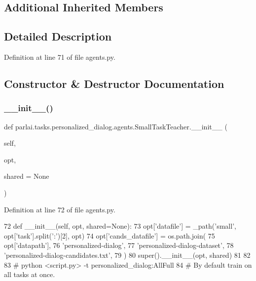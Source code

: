 \subsection*{Additional Inherited Members}


\subsection{Detailed Description}


Definition at line 71 of file agents.\+py.



\subsection{Constructor \& Destructor Documentation}
\mbox{\label{classparlai_1_1tasks_1_1personalized__dialog_1_1agents_1_1SmallTaskTeacher_a2e707f17a77f97a8a04ee9737d627209}} 
\subsubsection{\texorpdfstring{\+\_\+\+\_\+init\+\_\+\+\_\+()}{\_\_init\_\_()}}
{\footnotesize\ttfamily def parlai.\+tasks.\+personalized\+\_\+dialog.\+agents.\+Small\+Task\+Teacher.\+\_\+\+\_\+init\+\_\+\+\_\+ (\begin{DoxyParamCaption}\item[{}]{self,  }\item[{}]{opt,  }\item[{}]{shared = {\ttfamily None} }\end{DoxyParamCaption})}



Definition at line 72 of file agents.\+py.


\begin{DoxyCode}
72     \textcolor{keyword}{def }\_\_init\_\_(self, opt, shared=None):
73         opt[\textcolor{stringliteral}{'datafile'}] = \_path(\textcolor{stringliteral}{'small'}, opt[\textcolor{stringliteral}{'task'}].split(\textcolor{stringliteral}{':'})[2], opt)
74         opt[\textcolor{stringliteral}{'cands\_datafile'}] = os.path.join(
75             opt[\textcolor{stringliteral}{'datapath'}],
76             \textcolor{stringliteral}{'personalized-dialog'},
77             \textcolor{stringliteral}{'personalized-dialog-dataset'},
78             \textcolor{stringliteral}{'personalized-dialog-candidates.txt'},
79         )
80         super().\_\_init\_\_(opt, shared)
81 
82 
83 \textcolor{comment}{# python <script.py> -t personalized\_dialog:AllFull}
84 \textcolor{comment}{# By default train on all tasks at once.}
\end{DoxyCode}


